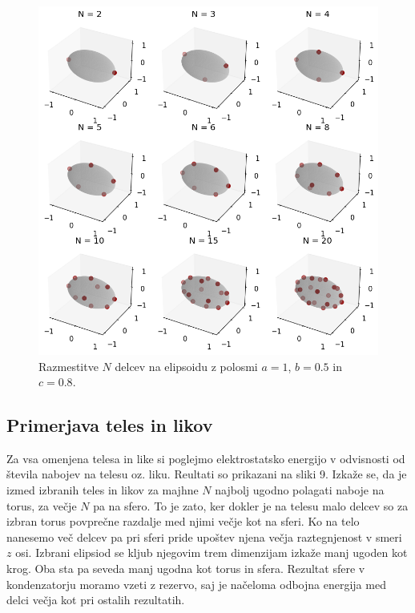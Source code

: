 \documentclass[slovene,11pt,a4paper]{article}
\begin{document}
\newpage

\begin{figure}[h!]
\centering
\includegraphics[width=12.5cm]{elipsoid.png}
\caption{Razmestitve $N$ delcev na elipsoidu z polosmi $a=1$, $b=0.5$ in $c=0.8$.}
\end{figure}

\subsection{Primerjava teles in likov}

Za vsa omenjena telesa in like si poglejmo elektrostatsko energijo v odvisnosti od števila nabojev na telesu oz. liku. Reultati so prikazani na sliki 9. Izkaže se, da je izmed izbranih teles in likov za majhne $N$ najbolj ugodno polagati naboje na torus, za večje $N$ pa na sfero. To je zato, ker dokler je na telesu malo delcev so za izbran torus povprečne razdalje med njimi večje kot na sferi. Ko na telo nanesemo več delcev pa pri sferi pride upoštev njena večja raztegnjenost v smeri $z$ osi. Izbrani elipsiod se kljub njegovim trem dimenzijam izkaže manj ugoden kot krog. Oba sta pa seveda manj ugodna kot torus in sfera. Rezultat sfere v kondenzatorju moramo vzeti z rezervo, saj je načeloma odbojna energija med delci večja kot pri ostalih rezultatih.

\newpage
\end{document}
